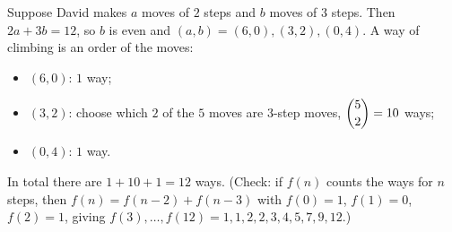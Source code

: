 Suppose David makes $a$ moves of $2$ steps and $b$ moves of $3$ steps. Then $2a+3b=12$, so $b$ is even and $(a,b)=(6,0),(3,2),(0,4)$. A way of climbing is an order of the moves:
\begin{itemize}
\item $(6,0)$: $1$ way;
\item $(3,2)$: choose which $2$ of the $5$ moves are $3$-step moves, $\dbinom52=10$ ways;
\item $(0,4)$: $1$ way.
\end{itemize}
In total there are $1+10+1=\boxed{12}$ ways. (Check: if $f(n)$ counts the ways for $n$ steps, then $f(n)=f(n-2)+f(n-3)$ with $f(0)=1$, $f(1)=0$, $f(2)=1$, giving $f(3),\dots,f(12)=1,1,2,2,3,4,5,7,9,12$.)
